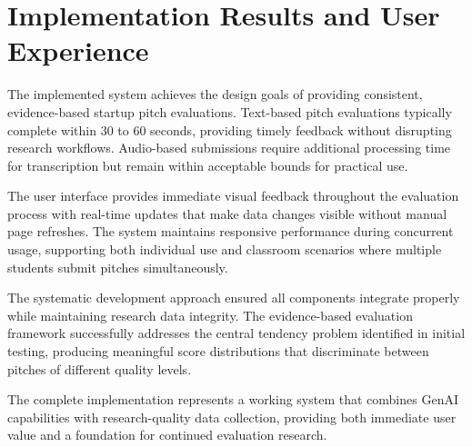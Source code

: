 \section{Implementation Results and User Experience}\label{sec:results}

The implemented system achieves the design goals of providing consistent, evidence-based startup pitch evaluations. Text-based pitch evaluations typically complete within 30 to 60 seconds, providing timely feedback without disrupting research workflows. Audio-based submissions require additional processing time for transcription but remain within acceptable bounds for practical use.

The user interface provides immediate visual feedback throughout the evaluation process with real-time updates that make data changes visible without manual page refreshes. The system maintains responsive performance during concurrent usage, supporting both individual use and classroom scenarios where multiple students submit pitches simultaneously.

The systematic development approach ensured all components integrate properly while maintaining research data integrity. The evidence-based evaluation framework successfully addresses the central tendency problem identified in initial testing, producing meaningful score distributions that discriminate between pitches of different quality levels.

The complete implementation represents a working system that combines GenAI capabilities with research-quality data collection, providing both immediate user value and a foundation for continued evaluation  research.
